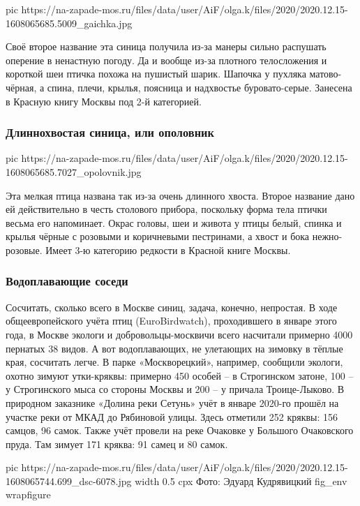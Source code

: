 \ifcmt
pic https://na-zapade-mos.ru/files/data/user/AiF/olga.k/files/2020/2020.12.15-1608065685.5009_gaichka.jpg
\fi

Своё второе название эта синица получила из-за манеры сильно распушать оперение
в ненастную погоду. Да и вообще из-за плотного телосложения и короткой шеи
птичка похожа на пушистый шарик. Шапочка у пухляка матово-чёрная, а спина,
плечи, крылья, поясница и надхвостье буровато-серые. Занесена в Красную книгу
Москвы под 2-й категорией.

\subsubsection{Длиннохвостая синица, или ополовник}

\ifcmt
pic https://na-zapade-mos.ru/files/data/user/AiF/olga.k/files/2020/2020.12.15-1608065685.7027_opolovnik.jpg
\fi

Эта мелкая птица названа так из-за очень длинного хвоста. Второе название дано
ей действительно в честь столового прибора, поскольку форма тела птички весьма
его напоминает. Окрас головы, шеи и живота у птицы белый, спинка и крылья
чёрные с розовыми и коричневыми пестринами, а хвост и бока нежно-розовые. Имеет
3-ю категорию редкости в Красной книге Москвы.

\subsubsection{Водоплавающие соседи}

Сосчитать, сколько всего в Москве синиц, задача, конечно, непростая. В ходе
общеевропейского учёта птиц (EuroBirdwatch), проходившего в январе этого года,
в Москве экологи и добровольцы-москвичи всего насчитали примерно 4000 пернатых
38 видов. А вот водоплавающих, не улетающих на зимовку в тёплые края, сосчитать
легче. В парке «Москворецкий», например, сообщили экологи, охотно зимуют
утки-кряквы: примерно 450 особей – в Строгинском затоне, 100 – у Строгинского
мыса со стороны Москвы и 200 – у причала Троице-Лыково. В природном заказнике
«Долина реки Сетунь» учёт в январе 2020-го прошёл на участке реки от МКАД до
Рябиновой улицы. Здесь отметили 252 кряквы: 156 самцов, 96 самок. Также учёт
провели на реке Очаковке у Большого Очаковского пруда. Там зимует 171 кряква:
91 самец и 80 самок.

\ifcmt
  pic https://na-zapade-mos.ru/files/data/user/AiF/olga.k/files/2020/2020.12.15-1608065744.699_dsc-6078.jpg
  width 0.5
	cpx Фото: Эдуард Кудрявицкий
  fig_env wrapfigure
\fi

